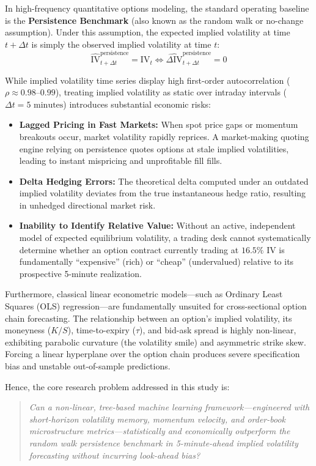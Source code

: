 In high-frequency quantitative options modeling, the standard operating baseline is the \textbf{Persistence Benchmark} (also known as the random walk or no-change assumption). Under this assumption, the expected implied volatility at time $t+\Delta t$ is simply the observed implied volatility at time $t$:
\begin{equation}
    \widehat{\text{IV}}_{t+\Delta t}^{\text{persistence}} = \text{IV}_t \iff \widehat{\Delta \text{IV}}_{t+\Delta t}^{\text{persistence}} = 0
\end{equation}

While implied volatility time series display high first-order autocorrelation ($\rho \approx 0.98$--$0.99$), treating implied volatility as static over intraday intervals ($\Delta t = 5\text{ minutes}$) introduces substantial economic risks:
\begin{itemize}
    \item \textbf{Lagged Pricing in Fast Markets:} When spot price gaps or momentum breakouts occur, market volatility rapidly reprices. A market-making quoting engine relying on persistence quotes options at stale implied volatilities, leading to instant mispricing and unprofitable fill fills.
    \item \textbf{Delta Hedging Errors:} The theoretical delta computed under an outdated implied volatility deviates from the true instantaneous hedge ratio, resulting in unhedged directional market risk.
    \item \textbf{Inability to Identify Relative Value:} Without an active, independent model of expected equilibrium volatility, a trading desk cannot systematically determine whether an option contract currently trading at $16.5\%$ IV is fundamentally ``expensive'' (rich) or ``cheap'' (undervalued) relative to its prospective 5-minute realization.
\end{itemize}

Furthermore, classical linear econometric models—such as Ordinary Least Squares (OLS) regression—are fundamentally unsuited for cross-sectional option chain forecasting. The relationship between an option's implied volatility, its moneyness ($K/S$), time-to-expiry ($\tau$), and bid-ask spread is highly non-linear, exhibiting parabolic curvature (the volatility smile) and asymmetric strike skew. Forcing a linear hyperplane over the option chain produces severe specification bias and unstable out-of-sample predictions.

Hence, the core research problem addressed in this study is:
\begin{quote}
\textit{Can a non-linear, tree-based machine learning framework—engineered with short-horizon volatility memory, momentum velocity, and order-book microstructure metrics—statistically and economically outperform the random walk persistence benchmark in 5-minute-ahead implied volatility forecasting without incurring look-ahead bias?}
\end{quote}


